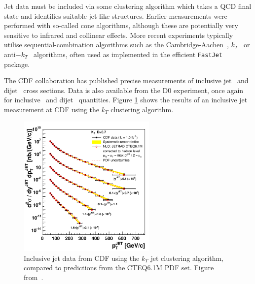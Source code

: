 Jet data must be included via some clustering algorithm which takes a QCD final state and identifies suitable jet-like structures. Earlier measurements were performed with so-called cone algorithms, although these are potentially very sensitive to infrared and collinear effects. More recent experiments typically utilise sequential-combination algorithms such as the Cambridge-Aachen~\cite{Dokshitzer:1997in,Wobisch:1998wt}, $k_T$~\cite{Ellis:1993tq} or anti$-k_T$~\cite{Cacciari:2008gp} algorithms, often used as implemented in the efficient {\tt FastJet}~\cite{Cacciari:2011ma} package.

The CDF collaboration has published precise measurements of inclusive jet~\cite{Abulencia:2007ez,Aaltonen:2008eq} and dijet~\cite{Aaltonen:2008dn} cross sections. Data is also available from the D0 experiment, once again for inclusive~\cite{Abazov:2008ae} and dijet~\cite{Abazov:2010fr} quantities.
Figure \ref{fig:CDFkTJet} shows the results of an inclusive jet measurement at CDF using the $k_T$ clustering algorithm.
\begin{figure}[ht]
\centering
\includegraphics[width=0.6\textwidth]{3-PDFdet/figs/CrossSectionAll.pdf}
\caption[Inclusive Jet data from the CDF experiment]{Inclusive jet data from CDF using the $k_T$ jet clustering algorithm, compared to predictions from the CTEQ6.1M PDF set. Figure from~\cite{Abulencia:2007ez}. }
\label{fig:CDFkTJet}
\end{figure}

